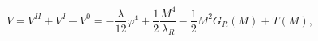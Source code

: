 \begin{equation}
V=V^{II}+V^{I}+V^{0}=-\frac{\lambda}{12}\varphi^{4}+\frac{1}{2}\frac{M^{4}%
}{\lambda_{R}}-\frac{1}{2}M^{2}G_{R}(M)+T(M),\label{vcr}%
\end{equation}


